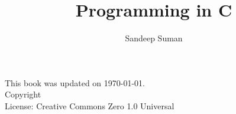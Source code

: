 \documentclass{book}
\title{Programming in C}
\author{Sandeep Suman}
\makeatletter
\newcommand{\booklicense}{Creative Commons Zero 1.0 Universal}
\newcommand{\bookauthor}{\@author}
\makeatother
\begin{document}
\frontmatter

\thispagestyle{empty}

\thispagestyle{empty}
\begin{flushleft}
\vspace*{\fill}
This book was updated on \today.\\
\vspace{\fill}
Copyright \textcopyright{} \the\year{}  \bookauthor\\
License: \booklicense 
\end{flushleft}
\addtocounter{page}{2}

\setcounter{tocdepth}{2}
\tableofcontents

\mainmatter


\backmatter
{}
\printindex
\end{document}
